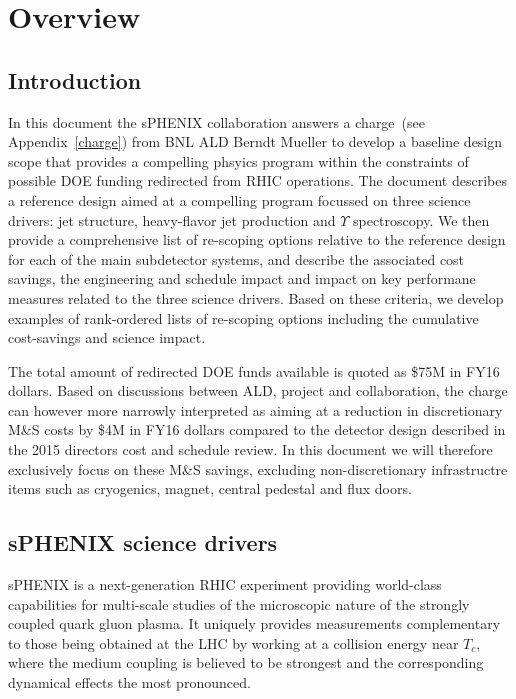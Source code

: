 \chapter*{Overview}
\label{configurations}
\setcounter{page}{1}

\section{Introduction}
In this document the sPHENIX collaboration answers a charge~(see
Appendix~\ref{charge}) from BNL ALD Berndt Mueller to develop
a baseline design scope that provides a compelling phsyics program
within the constraints of possible DOE funding redirected from 
RHIC operations. The document describes a reference design aimed
at a compelling program focussed on three science drivers: jet structure,
heavy-flavor jet production and $\Upsilon$ spectroscopy. We then
provide a comprehensive list of re-scoping options relative 
to the reference design for each
of the main subdetector systems, and describe the associated
cost savings, the engineering and schedule impact and impact on 
key performane measures related to the three science 
drivers. Based on these criteria, we develop examples of 
rank-ordered lists of re-scoping options including the 
cumulative cost-savings and science impact.

The total amount of redirected DOE funds available is quoted as \$75M in FY16 dollars.
Based on discussions between ALD, project and collaboration, the charge can
however more narrowly interpreted as aiming at a reduction in discretionary M\&S costs 
by \$4M in FY16 dollars compared to the detector design described
in the 2015 directors cost and schedule review. In this document we will
therefore exclusively focus on these M\&S savings, excluding non-discretionary 
infrastructre items such as cryogenics, magnet, central pedestal and flux doors.

\section{sPHENIX science drivers}

sPHENIX is a next-generation RHIC experiment providing world-class
capabilities for multi-scale studies of the microscopic nature
of the strongly coupled quark gluon plasma.
It uniquely provides measurements complementary to those being
obtained at the LHC by working at a collision energy near $T_c$, where
the medium coupling is believed to be strongest and the corresponding
dynamical effects the most pronounced.


